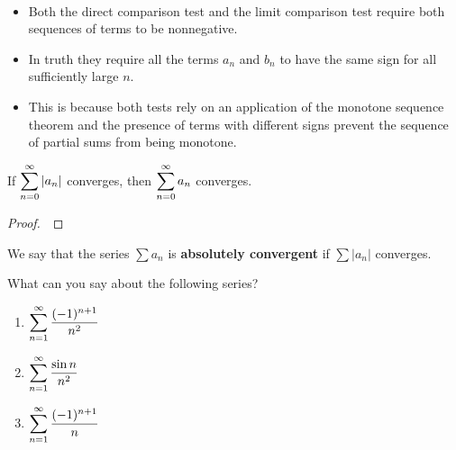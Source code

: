

\begin{remark}\,
\begin{itemize}
\item Both the direct comparison test and the limit comparison test require both sequences of terms to be nonnegative.  
\item In truth they require all the terms $a_n$ and $b_n$ to have the same sign for all sufficiently large $n$.
\item This is because both tests rely on an application of the monotone sequence theorem and the presence of terms with different signs prevent the sequence of partial sums from being monotone.
\end{itemize}
\end{remark}

\begin{theorem}
If $\displaystyle\sum_{n=0}^\infty |a_n|$ converges, then $\displaystyle\sum_{n=0}^\infty a_n$ converges.
\end{theorem}

\begin{proof}\,

\vspace{4in}

\end{proof}

\begin{definition}
We say that the series $\sum a_n$ is \textbf{absolutely convergent} if $\sum |a_n|$ converges.
\end{definition}

\newpage

\begin{example}
What can you say about the following series?
\begin{enumerate}
\item $\displaystyle\sum_{n=1}^\infty\frac{(-1)^{n+1}}{n^2}$
\vfill
\item $\displaystyle\sum_{n=1}^\infty\frac{\sin n}{n^2}$
\vfill
\item $\displaystyle\sum_{n=1}^\infty\frac{(-1)^{n+1}}{n}$
\vfill
\end{enumerate}
\end{example}

\newpage


